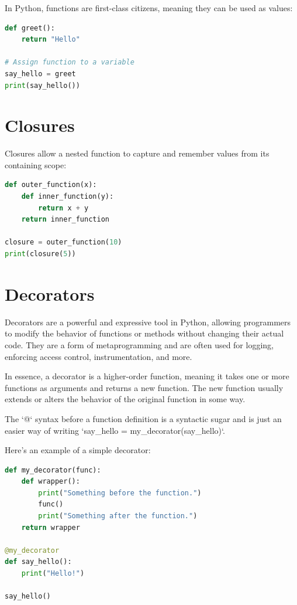 \documentclass[12pt]{book}
\begin{document}
In Python, functions are first-class citizens, meaning they can be used as values:

\begin{lstlisting}[language=Python]
def greet():
    return "Hello"

# Assign function to a variable
say_hello = greet
print(say_hello())
\end{lstlisting}

\section{Closures}

Closures allow a nested function to capture and remember values from its containing scope:

\begin{lstlisting}[language=Python]
def outer_function(x):
    def inner_function(y):
        return x + y
    return inner_function

closure = outer_function(10)
print(closure(5))
\end{lstlisting}


\section{Decorators}

Decorators are a powerful and expressive tool in Python, allowing programmers to modify the behavior of functions or methods without changing their actual code. They are a form of metaprogramming and are often used for logging, enforcing access control, instrumentation, and more.

In essence, a decorator is a higher-order function, meaning it takes one or more functions as arguments and returns a new function. The new function usually extends or alters the behavior of the original function in some way.

The `@` syntax before a function definition is a syntactic sugar and is just an easier way of writing `say_hello = my_decorator(say_hello)`. 

Here's an example of a simple decorator:

\begin{lstlisting}[language=Python]
def my_decorator(func):
    def wrapper():
        print("Something before the function.")
        func()
        print("Something after the function.")
    return wrapper

@my_decorator
def say_hello():
    print("Hello!")
    
say_hello()
\end{lstlisting}
\end{document}

